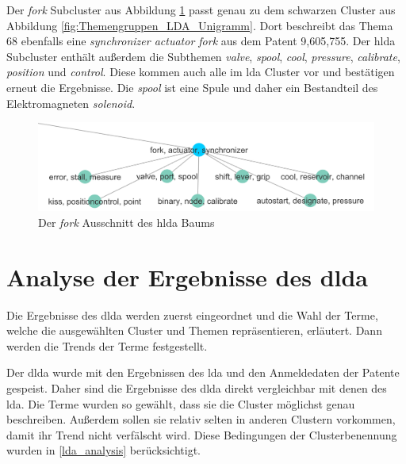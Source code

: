 Der \emph{fork} Subcluster aus Abbildung \ref{fig:hlda_fork} passt genau zu dem schwarzen Cluster aus Abbildung \ref{fig:Themengruppen_LDA_Unigramm}. Dort beschreibt das Thema 68 ebenfalls eine \emph{synchronizer actuator fork} aus dem Patent 9,605,755. Der \gls{hlda} Subcluster enthält außerdem die Subthemen \emph{valve}, \emph{spool}, \emph{cool}, \emph{pressure}, \emph{calibrate}, \emph{position} und \emph{control}. Diese kommen auch alle im \gls{lda} Cluster vor und bestätigen erneut die Ergebnisse. Die \emph{spool} ist eine Spule und daher ein Bestandteil des Elektromagneten \emph{solenoid}.

\begin{figure}[htpb]
	\centering
	\includegraphics[width=\textwidth,keepaspectratio=true]{img/hldaFork.png}
	\caption{
		Der \emph{fork} Ausschnitt des \gls{hlda} Baums
	}
	\label{fig:hlda_fork}
\end{figure}


\section{Analyse der Ergebnisse des \gls{dlda}}

Die Ergebnisse des \gls{dlda} werden zuerst eingeordnet und die Wahl der Terme, welche die ausgewählten Cluster und Themen repräsentieren, erläutert. Dann werden die Trends der Terme festgestellt.

Der \gls{dlda} wurde mit den Ergebnissen des \gls{lda} und den Anmeldedaten der Patente gespeist. Daher sind die Ergebnisse des \gls{dlda} direkt vergleichbar mit denen des \gls{lda}. Die Terme wurden so gewählt, dass sie die Cluster möglichst genau beschreiben. Außerdem sollen sie relativ selten in anderen Clustern vorkommen, damit ihr Trend nicht verfälscht wird. Diese Bedingungen der Clusterbenennung wurden in \ref{lda_analysis} berücksichtigt.



